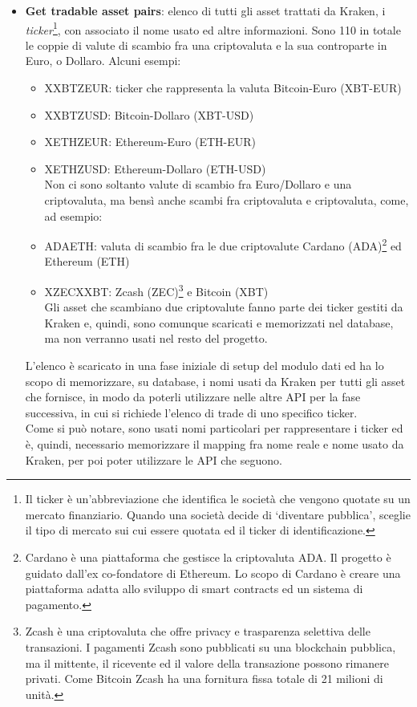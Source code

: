 \documentclass[a4paper,12pt]{report}
\begin{document}
\begin{itemize}
	\item \textbf{Get tradable asset pairs}: elenco di tutti gli asset trattati da Kraken, i \textit{ticker}\footnote{Il ticker è un’abbreviazione che identifica le società che vengono quotate su un mercato finanziario. Quando una società decide di ‘diventare pubblica’, sceglie il tipo di mercato sui cui essere quotata ed il ticker di identificazione.}, con associato il nome usato ed altre informazioni. Sono 110 in totale le coppie di valute di scambio fra una criptovaluta e la sua controparte in Euro, o Dollaro. Alcuni esempi:
	\begin{itemize}
		\item XXBTZEUR: ticker che rappresenta la valuta Bitcoin-Euro (XBT-EUR)
		\item XXBTZUSD: Bitcoin-Dollaro (XBT-USD)
		\item XETHZEUR: Ethereum-Euro (ETH-EUR)
		\item XETHZUSD: Ethereum-Dollaro (ETH-USD)\\
		
		Non ci sono soltanto valute di scambio fra Euro/Dollaro e una criptovaluta, ma bensì anche scambi fra criptovaluta e criptovaluta, come, ad esempio:
		\item ADAETH: valuta di scambio fra le due criptovalute Cardano (ADA)\footnote{Cardano è una piattaforma che gestisce la criptovaluta ADA. Il progetto è guidato dall'ex co-fondatore di Ethereum. Lo scopo di Cardano è creare una piattaforma adatta allo sviluppo di smart contracts ed un sistema di pagamento.} ed Ethereum (ETH)
		\item XZECXXBT: Zcash (ZEC)\footnote{Zcash è una criptovaluta che offre privacy e trasparenza selettiva delle transazioni. I pagamenti Zcash sono pubblicati su una blockchain pubblica, ma il mittente, il ricevente ed il valore della transazione possono rimanere privati. Come Bitcoin Zcash ha una fornitura fissa totale di 21 milioni di unità.} e Bitcoin (XBT)\\
		
		Gli asset che scambiano due criptovalute fanno parte dei ticker gestiti da Kraken e, quindi, sono comunque scaricati e memorizzati nel database, ma non verranno usati nel resto del progetto.
		
	\end{itemize}
	
	L'elenco è scaricato in una fase iniziale di setup del modulo dati ed ha lo scopo di memorizzare, su database, i nomi usati da Kraken per tutti gli asset che fornisce, in modo da poterli utilizzare nelle altre API per la fase successiva, in cui si richiede l'elenco di trade di uno specifico ticker.\\Come si può notare, sono usati nomi particolari per rappresentare i ticker ed è, quindi, necessario memorizzare il mapping fra nome reale e nome usato da Kraken, per poi poter utilizzare le API che seguono.\\
	

\end{itemize}
\end{document}
